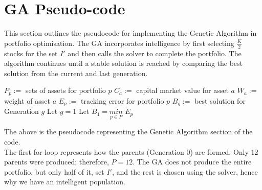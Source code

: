 \documentclass[12pt]{report}
\begin{document}
\section{GA Pseudo-code} \label{pseudoga}

This section outlines the pseudocode for implementing the Genetic Algorithm in portfolio optimisation. The GA incorporates intelligence by first selecting $\frac{K}{2}$ stocks for the set $I'$ and then calls the solver to complete the portfolio. The algorithm continues until a stable solution is reached by comparing the best solution from the current and last generation.
\begin{algorithm}[h!]
$P_p :=$ sets of assets for portfolio $p$\;
$C_a := $ capital market value for asset $a$ \;
$W_a := $ weight of asset $a$ \;
$E_p :=$ tracking error for portfolio $p$\;
$B_g :=$ best solution for Generation $g$\;
Let $g = 1$\;
Let $B_1 = \underset{p \in P}{min}$ $E_p$\;
\end{algorithm}
\noindent
The above is the pseudocode representing the Genetic Algorithm section of the code.\\ \noindent 
The first for-loop represents how the parents (Generation 0) are formed. Only 12 parents were produced; therefore, $P = 12$. The GA does not produce the entire portfolio, but only half of it, set $I'$, and the rest is chosen using the solver, hence why we have an intelligent population.  \\ \newline
\end{document}
